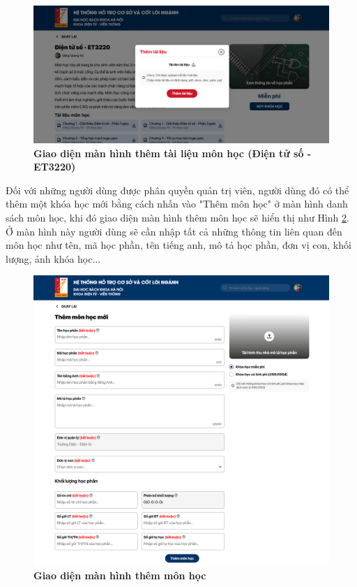 \documentclass{article}
\begin{document}
	 \begin{figure}[!ht]
	 	\centering
	 	\includegraphics[trim= 10pt 10pt 10pt 10pt, clip, width=14cm]{localhost_3000_courses_ET3220_doc.png}
	 	\caption [Giao diện màn hình thêm tài liệu môn học (Điện tử số - ET3220)]{\bfseries \fontsize{12pt}{0pt}\selectfont Giao diện màn hình thêm tài liệu môn học (Điện tử số - ET3220)}
	 	\label{fig48}
	 \end{figure}
	 
	 Đối với những người dùng được phân quyền quản trị viên, người dùng đó có thể thêm một khóa học mới bằng cách nhấn vào "Thêm môn học" ở màn hình danh sách môn học, khi đó giao diện màn hình thêm môn học sẽ hiển thị như Hình \ref{fig49}. Ở màn hình này người dùng sẽ cần nhập tất cả những thông tin liên quan đến môn học như tên, mã học phần, tên tiếng anh, mô tả học phần, đơn vị con, khối lượng, ảnh khóa học...
	 
	 \begin{figure}[!ht]
	 	\centering
	 	\includegraphics[trim= 10pt 10pt 10pt 10pt, clip, width=14cm]{localhost_3000_add-course.png}
	 	\caption [Giao diện màn hình thêm môn học]{\bfseries \fontsize{12pt}{0pt}\selectfont Giao diện màn hình thêm môn học}
	 	\label{fig49}
	 \end{figure}
\end{document}
